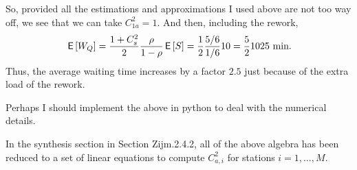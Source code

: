 \begin{exercise}
\begin{solution}
So, provided all the estimations and approximations I used above are
not too way off, we see that we can take $C_{1a}^2=1$. And then, including the rework,
  \begin{equation*}
    \,\mathsf{E}\left[W_Q\right] = \frac{1+C_s^2}2 \frac{\rho}{1-\rho} \,\mathsf{E}\left[S\right] = \frac 12 \frac{5/6}{1/6} 10 = \frac 52 10 25 \text{ min}.
  \end{equation*}
  Thus, the average waiting time increases by a factor $2.5$ just
  because of the extra load of the rework.  

  Perhaps I should implement the above in python to deal with the
  numerical details.

  In the synthesis section in Section Zijm.2.4.2, all of the above
  algebra has been reduced to a set of linear equations to compute
  $C_{a,i}^2$ for stations $i=1,\ldots,M$.
\end{solution}
\end{exercise}


